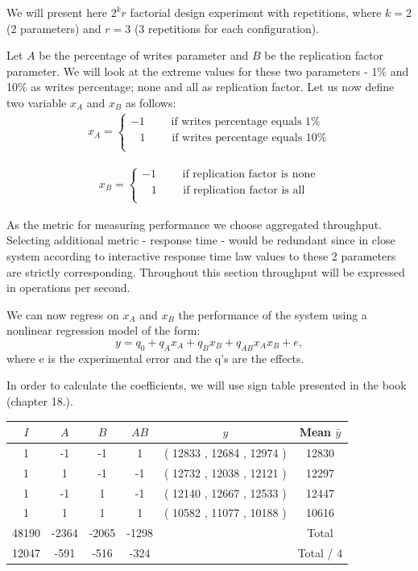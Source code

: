\documentclass[11pt]{article}
\begin{document}
We will present here $2^kr$ factorial design experiment with repetitions, where $k = 2$ (2 parameters) and $r = 3$ (3 repetitions for each configuration).

Let $A$ be the percentage of writes parameter and $B$ be the replication factor parameter. We will look at the extreme values for these two parameters - 1\% and 10\% as writes percentage; none and all as replication factor. Let us now define two variable $x_A$ and $x_B$ as follows:
\begin{gather*}
x_A = 
\begin{cases}
-1 \qquad \text{ if writes percentage equals 1\%} \\ 
\;\;\;1 \qquad \text{ if writes percentage equals 10\%} \\ 
\end{cases}
\end{gather*}

\begin{gather*}
x_B = 
\begin{cases}
-1 \qquad \text{ if replication factor is none} \\ 
\;\;\;1 \qquad \text{ if replication factor is all} \\ 
\end{cases}
\end{gather*}

As the metric for measuring performance we choose aggregated throughput. Selecting additional metric - response time - would be redundant since in close system according to interactive response time law values to these 2 parameters are strictly corresponding. Throughout this section throughput will be expressed in operations per second.

We can now regress on $x_A$ and $x_B$ the performance of the system using a nonlinear regression model of the form:
$$y = q_0 + q_Ax_A + q_Bx_B + q_{AB}x_Ax_B + e,$$
where e is the experimental error and the q’s are the effects.

In order to calculate the coefficients, we will use sign table presented in the book (chapter 18.).
\medskip

\begin{center}
\begin{tabular}{|c|c|c|c|c|c|}
\hline $I$ & $A$ & $B$ & $AB$ & $y$ &Mean $\bar{y}$ \\
\hline	1	&	-1	&	-1	&	1	&	(	12833	,	12684	,	12974	) &	12830	\\
\hline	1	&	1	&	-1	&	-1	&	(	12732	,	12038	,	12121	) &	12297	\\
\hline	1	&	-1	&	1	&	-1	&	(	12140	,	12667	,	12533	) &	12447	\\
\hline	1	&	1	&	1	&	1	&	(	10582	,	11077	,	10188	) &	10616	\\
\hline	48190	&	-2364	&	-2065	&	-1298	&							&	Total	\\
\hline	12047	&	-591	&	-516	&	-324	&							&	Total / 4	\\
\hline
\end{tabular}
\end{center}
\medskip
\end{document}
